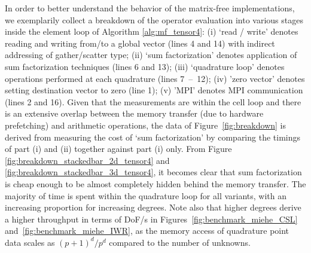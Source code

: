 \documentclass[AMA,STIX1COL]{WileyNJD-v2}
\begin{document}
In order to better understand the behavior of the matrix-free implementations,
we exemplarily collect a breakdown of the operator evaluation into various stages inside the element loop of Algorithm \ref{alg:mf_tensor4}:
(i) `read / write' denotes reading and writing from/to a global vector (lines 4 and 14) with indirect addressing of gather/scatter type;
(ii) `sum factorization' denotes application of sum factorization techniques (lines 6 and 13);
(iii) `quadrature loop' denotes operations performed at each quadrature (lines \mbox{7 -- 12});
(iv) 'zero vector' denotes setting destination vector to zero (line 1);
(v) 'MPI' denotes MPI communication (lines 2 and 16).
{\color{red}
Given that the measurements are within the cell loop and there is an extensive overlap between the memory transfer (due to hardware prefetching) and arithmetic operations, the data of Figure~\ref{fig:breakdown} is derived from measuring the cost of `sum factorization' by comparing the timings of part (i) and (ii) together against part (i) only.
From Figure \ref{fig:breakdown_stackedbar_2d_tensor4} and  \ref{fig:breakdown_stackedbar_3d_tensor4}, it becomes clear that sum factorization is cheap enough to be almost completely hidden behind the memory transfer.
The majority of time is spent within the quadrature loop for all variants, with an increasing proportion for increasing degrees. Note also that higher degrees derive a higher throughput in terms of DoF/s in Figures~\ref{fig:benchmark_miehe_CSL} and~\ref{fig:benchmark_miehe_IWR}, as the memory access of quadrature point data scales as $(p+1)^d/p^d$ compared to the number of unknowns.
}
\end{document}
